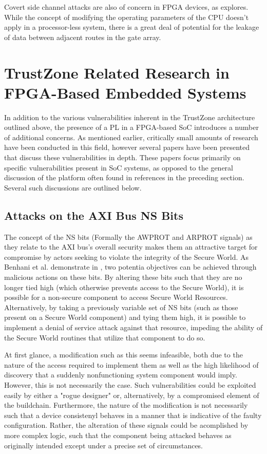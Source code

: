 \documentclass[journal]{IEEEtran}
\begin{document}
Covert side channel attacks are also of concern in FPGA devices, as 
\cite{giechaskiel_leaky_2018} explores. While the concept of modifying the operating
parameters of the CPU doesn't apply in a processor-less system, there is a great deal of
potential for the leakage of data between adjacent routes in the gate array.

\section{TrustZone Related Research in FPGA-Based Embedded Systems}
In addition to the various vulnerabilities inherent in the TrustZone architecture outlined
above, the presence of a PL in a FPGA-based SoC introduces a number of
additional concerns. As mentioned earlier, critically small amounts of research
have been conducted in this field, however several papers have been presented that discuss
these vulnerabilities in depth. These papers focus primarily on specific vulnerabilities
present in SoC systems, as opposed to the general discussion of the platform often found
in references in the preceding section. Several such discussions are outlined below.

\subsection{Attacks on the AXI Bus NS Bits}
The concept of the NS bits (Formally the AWPROT and ARPROT signals) as they relate to the
AXI bus's overall security makes them an attractive target for compromise by actors 
seeking to violate the integrity of the Secure World. As Benhani et al. demonstrate in 
\cite{benhani_security_2019}, two potentia objectives can be achieved through malicious 
actions on these bits. By altering these bits such that they are no longer tied high 
(which otherwise prevents access to the Secure World), it is possible for a non-secure 
component to access Secure World Resources. Alternatively, by taking a previously variable
set of NS bits (such as those present on a Secure World component) and tying them high, it
is possible to implement a denial of service attack against that resource, impeding the 
ability of the Secure World routines that utilize that component to do so.

At first glance, a modification such as this seems infeasible, both due to the nature of
the access required to implement them as well as the high likelihood of discovery that a
suddenly nonfunctioning system component would imply. However, this is not necessarily the
case. Such vulnerabilities could be exploited easily by either a "rogue designer" or,
alternatively, by a compromised element of the buildchain. Furthermore, the nature of the
modification is not necessarily such that a device consistenyl behaves in a manner that is
indicative of the faulty configuration. Rather, the alteration of these signals could be
acomplished by more complex logic, such that the component being attacked behaves as
originally intended except under a precise set of circumstances.
\end{document}
